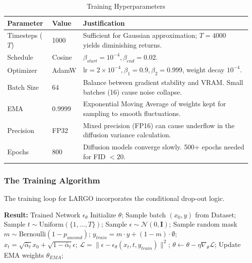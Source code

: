\documentclass[12pt, a4paper]{article}
\begin{document}
\begin{table}[H]
    \centering
    \caption{Training Hyperparameters}
    \begin{tabular}{@{}lp{}p{}@{}}
        \toprule
        \textbf{Parameter} & \textbf{Value} & \textbf{Justification} \\
        \midrule
        Timesteps ($T$) & 1000 & Sufficient for Gaussian approximation; $T=4000$ yields diminishing returns. \\
        Schedule & Cosine & $\beta_{start} = 10^{-4}, \beta_{end} = 0.02$. \\
        Optimizer & AdamW & $\text{lr}=2\times 10^{-4}, \beta_1=0.9, \beta_2=0.999$, weight decay $10^{-4}$. \\
        Batch Size & 64 & Balance between gradient stability and VRAM. Small batches (16) cause noise collapse. \\
        EMA & 0.9999 & Exponential Moving Average of weights kept for sampling to smooth fluctuations. \\
        Precision & FP32 & Mixed precision (FP16) can cause underflow in the diffusion variance calculation. \\
        Epochs & 800 & Diffusion models converge slowly. 500+ epochs needed for FID $< 20$. \\
        \bottomrule
    \end{tabular}
\end{table}

\subsubsection{The Training Algorithm}
The training loop for LARGO incorporates the conditional drop-out logic.

\begin{algorithm}[H]
\caption{LARGO Training Step}
\begin{algorithmic}[1]
\State \textbf{Result:} Trained Network $\epsilon_\theta$
\State Initialize $\theta$;
    \State Sample batch $(x_0, y)$ from Dataset;
    \State Sample $t \sim \text{Uniform}(\{1, \dots, T\})$;
    \State Sample $\epsilon \sim \mathcal{N}(0, \mathbf{I})$;
    \State {}
    \State Sample random mask $m \sim \text{Bernoulli}(1 - p_{uncond})$;
    \State $y_{train} = m \cdot y + (1-m) \cdot \emptyset$;
    \State {}
    \State $x_t = \sqrt{\bar{\alpha}_t} x_0 + \sqrt{1-\bar{\alpha}_t} \epsilon$;
    \State {}
    \State $\mathcal{L} = \| \epsilon - \epsilon_\theta(x_t, t, y_{train}) \|^2$;
    \State {}
    \State $\theta \gets \theta - \eta \nabla_\theta \mathcal{L}$;
    \State Update EMA weights $\theta_{EMA}$;
\EndWhile
\end{algorithmic}
\end{algorithm}
\end{document}
